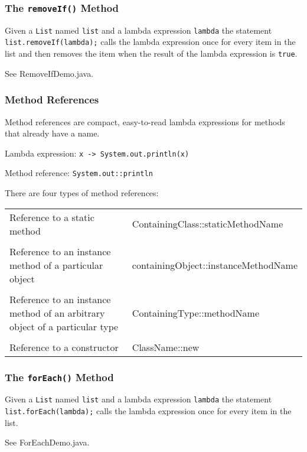 \documentclass{beamer}
\newcommand{\mil}[1]{\texttt{#1}}
\begin{document}
\begin{frame}

    \frametitle{The \mil{removeIf()} Method}
    
    Given a \mil{List} named \mil{list} and a lambda expression \mil{lambda} the statement \mil{list.removeIf(lambda);} calls the lambda expression once for every item in the list and then removes the item when the result of the lambda expression is \mil{true}.
    
    \bigskip
    
    See RemoveIfDemo.java.
       
\end{frame}

\begin{frame}

    \frametitle{Method References}

    Method references are compact, easy-to-read lambda expressions for methods that already have a name.
    
    \bigskip
    
    Lambda expression:  \mil{x -> System.out.println(x)}
    
    \bigskip
    
    Method reference:  \mil{System.out::println}
    
    \bigskip
    
    There are four types of method references:
    
    \bigskip
    
\scriptsize{    
\begin{tabular}{p{1.5in}l}
Reference to a static method &	ContainingClass::staticMethodName\\
 & \\
Reference to an instance method of a particular object &	containingObject::instanceMethodName\\
 & \\
Reference to an instance method of an arbitrary object of a particular type	& ContainingType::methodName\\
 & \\
Reference to a constructor	& ClassName::new 
\end{tabular}   }
\end{frame}

\begin{frame}

    \frametitle{The \mil{forEach()} Method}
    
    Given a \mil{List} named \mil{list} and a lambda expression \mil{lambda} the statement \mil{list.forEach(lambda);} calls the lambda expression once for every item in the list.
    
    \bigskip
    
    See ForEachDemo.java.
       
\end{frame}
\end{document}
